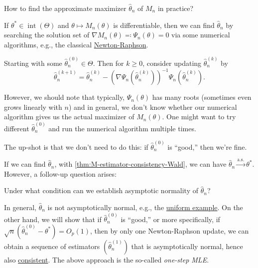 \begin{problem*}
	How to find the approximate maximizer \(\hat{\theta} _n\) of \(M_n\) in practice?
\end{problem*}
\begin{answer}
	If \(\theta ^{\ast} \in \operatorname{int}(\Theta ) \) and \(\theta \mapsto M_n(\theta )\) is differentiable, then we can find \(\hat{\theta} _n\) by searching the solution set of \(\nabla M_n(\theta ) \eqqcolon \Psi _n(\theta ) = 0\) via some numerical algorithms, e.g., the classical \href{https://en.wikipedia.org/wiki/Newton%27s_method}{Newton-Raphson}.
\end{answer}

\begin{prev}
	Starting with some \(\hat{\theta} _n^{(0)} \in \Theta \). Then for \(k \geq 0\), consider updating \(\hat{\theta} _n^{(k)}\) by
	\[
		\hat{\theta} _n^{(k+1)}
		= \hat{\theta} _n^{(k)} - \left( \nabla \Psi _n(\hat{\theta} _n^{(k)}) \right) ^{-1} \Psi _n(\hat{\theta} _n^{(k)}).
	\]
\end{prev}

However, we should note that typically, \(\Psi _n(\theta )\) has many roots (sometimes even grows linearly with \(n\)) and in general, we don't know whether our numerical algorithm gives us the actual maximizer of \(M_n(\theta )\). One might want to try different \(\hat{\theta} _n^{(0)}\) and run the numerical algorithm multiple times.

\begin{intuition}
	The up-shot is that we don't need to do this: if \(\hat{\theta} _n^{(0)}\) is ``good,'' then we're fine.
\end{intuition}

If we can find \(\hat{\theta} _n\), with \autoref{thm:M-estimator-consistency-Wald}, we can have \(\hat{\theta} _n \overset{\text{a.s.} }{\to} \theta ^{\ast} \). However, a follow-up question arises:

\begin{problem*}
	Under what condition can we establish asymptotic normality of \(\hat{\theta} _n\)?
\end{problem*}
\begin{answer}
	In general, \(\hat{\theta} _n\) is not asymptotically normal, e.g., the \hyperref[eg:uniform-is-not-asymptotically-normal]{uniform example}. On the other hand, we will show that if \(\hat{\theta} _n^{(0)}\) is ``good,'' or more specifically, if \(\sqrt{n} (\hat{\theta} _n^{(0)} - \theta ^{\ast} ) = O_p(1)\), then by only one Newton-Raphson update, we can obtain a sequence of estimators \((\hat{\theta} _n^{(1)})\) that is asymptotically normal, hence also \hyperref[def:consistent]{consistent}. The above approach is the so-called \emph{one-step MLE}.
\end{answer}